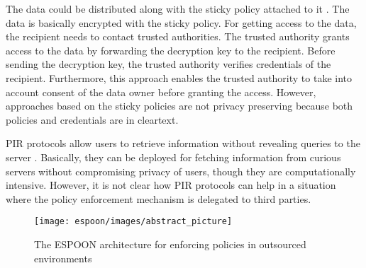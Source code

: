 \documentclass[epsfig,a4paper,11pt,titlepage]{book}
\numberwithin{algorithm}{chapter}
\begin{document}
The data could be distributed along with the sticky policy attached to it \cite{Mont:2003, Chadwick:2008, Pearson:2011}. The data is basically encrypted with the sticky policy. For getting access to the data, the recipient needs to contact trusted authorities. The trusted authority grants access to the data by forwarding the decryption key to the recipient. Before sending the decryption key, the trusted authority verifies credentials of the recipient. Furthermore, this approach enables the trusted authority to take into account consent of the data owner before granting the access. However, approaches based on the sticky policies are not privacy preserving because both policies and credentials are in cleartext.

\gls{PIR} protocols allow users to retrieve information without revealing queries to the server \cite{Chor:1998, PIR, Yekhanin:2010, Williams:2008, Goldberg:2007, Camenisch:2009, Camenisch:2012, Olumofin:2012}. Basically, they can be deployed for fetching information from curious servers without compromising privacy of users, though they are computationally intensive. However, it is not clear how \gls{PIR} protocols can help in a situation where the policy enforcement mechanism is delegated to third parties.

\begin{figure} [htp]
\centering
\texttt{[image: espoon/images/abstract\_picture]}
\caption[The ESPOON architecture for enforcing policies]{The \gls{ESPOON} architecture for enforcing policies in outsourced environments}
\label{fig:espoon-abstract_picture}
\end{figure}
\end{document}
